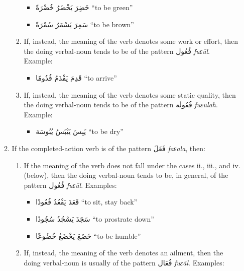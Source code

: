 \documentclass[
  10pt,
]{book}
\providecommand{\tightlist}{%
  \setlength{\itemsep}{0pt}\setlength{\parskip}{0pt}}
\begin{document}
\begin{enumerate}
\begin{enumerate}
\begin{enumerate}
      \begin{itemize}
      \tightlist
      \item
        \foreignlanguage{arabic}{خَضِرَ يَخْضَرُ خُضْرَةً} \enquote{to be green}
      \item
        \foreignlanguage{arabic}{سَمِرَ يَسْمَرُ سُمْرَةً} \enquote{to be brown}
      \end{itemize}
    \item
      If, instead, the meaning of the verb denotes some work or effort, then the doing verbal-noun tends to be of the pattern \foreignlanguage{arabic}{فُعُول} \emph{fuɛūl}. Example:

      \begin{itemize}
      \tightlist
      \item
        \foreignlanguage{arabic}{قَدِمَ يَقْدَمُ قُدُومًا} \enquote{to arrive}
      \end{itemize}
    \item
      If, instead, the meaning of the verb denotes some static quality, then the doing verbal-noun tends to be of the pattern \foreignlanguage{arabic}{فُعُولَة} \emph{fuɛūlah}. Example:

      \begin{itemize}
      \tightlist
      \item
        \foreignlanguage{arabic}{يَبِسَ يَيْبَسُ يُبُوسَة} \enquote{to be dry}
      \end{itemize}
    \end{enumerate}
  \item
    If the completed-action verb is of the pattern \foreignlanguage{arabic}{فَعَلَ} \emph{faɛala}, then:

    \begin{enumerate}
    \def\labelenumiii{\roman{enumiii}.}
    \tightlist
    \item
      If the meaning of the verb does not fall under the cases ii., iii., and iv. (below), then the doing verbal-noun tends to be, in general, of the pattern \foreignlanguage{arabic}{فُعُول} \emph{fuɛūl}. Examples:

      \begin{itemize}
      \tightlist
      \item
        \foreignlanguage{arabic}{قَعَدَ يَقْعُدُ قُعُودًا} \enquote{to sit, stay back}
      \item
        \foreignlanguage{arabic}{سَجَدَ يَسْجُدُ سُجُودًا} \enquote{to prostrate down}
      \item
        \foreignlanguage{arabic}{خَضَعَ يَخْضَعُ خُضُوعًا} \enquote{to be humble}
      \end{itemize}
    \item
      If, instead, the meaning of the verb denotes an ailment, then the doing verbal-noun is usually of the pattern \foreignlanguage{arabic}{فُعَال} \emph{fuɛāl}. Examples:


\end{enumerate}
\end{enumerate}
\end{enumerate}
\end{document}
